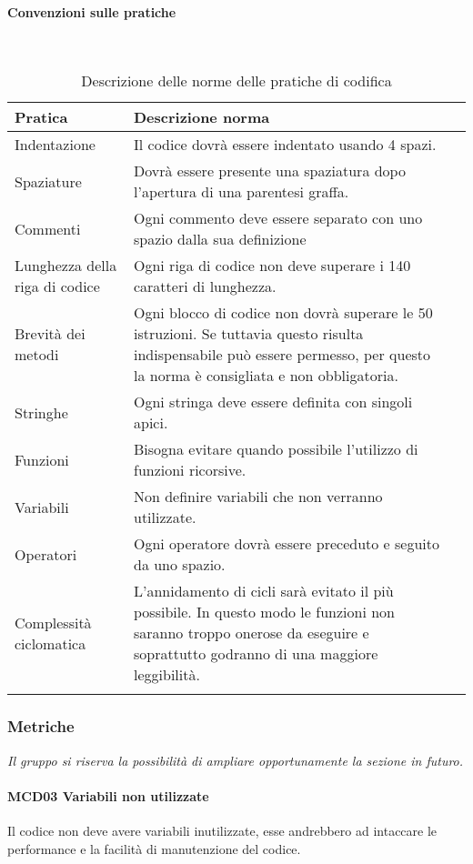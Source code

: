 \paragraph{Convenzioni sulle pratiche}
\
{
	\setlength{\freewidth}{\dimexpr\textwidth-0\tabcolsep}
	\renewcommand{\arraystretch}{1.5}
	\setlength{\aboverulesep}{0pt}
	\setlength{\belowrulesep}{0pt}
	\begin{longtable}{L{.210\freewidth} L{.6\freewidth} L{.080\freewidth}}
		\toprule 
		\textbf{Pratica} & \textbf{Descrizione norma} \\
		\toprule
		\endhead		
		Indentazione & Il codice dovrà essere indentato usando 4 spazi. \\ 
		Spaziature & Dovrà essere presente una spaziatura dopo l'apertura di una parentesi graffa.  \\
		Commenti & Ogni commento deve essere separato con uno spazio dalla sua definizione \\ 
		Lunghezza della riga di codice & Ogni riga di codice non deve superare i 140 caratteri di lunghezza. \\
		Brevità dei metodi & Ogni blocco di codice non dovrà superare le 50 istruzioni. Se tuttavia questo risulta indispensabile può essere permesso, per questo la norma è consigliata e non obbligatoria.\\ 	
		Stringhe & Ogni stringa deve essere definita con singoli apici. \\
		Funzioni & Bisogna evitare quando possibile l'utilizzo di funzioni ricorsive.\\ 	
		Variabili & Non definire variabili che non verranno utilizzate.\\ 	
		Operatori & Ogni operatore dovrà essere preceduto e seguito da uno spazio.\\ 	
		Complessità ciclomatica & L'annidamento di cicli sarà evitato il più possibile. In questo modo le funzioni non saranno troppo onerose da eseguire e soprattutto godranno di una maggiore leggibilità. \\  			
		\bottomrule
		\hiderowcolors
		\caption{Descrizione delle norme delle pratiche di codifica}
	\end{longtable}
}
\subsubsection{Metriche}
\textit{Il gruppo si riserva la possibilità di ampliare opportunamente la sezione in futuro.}
\paragraph{MCD03 Variabili non utilizzate}
Il codice non deve avere variabili inutilizzate, esse andrebbero ad intaccare le performance e la facilità di manutenzione del codice.
